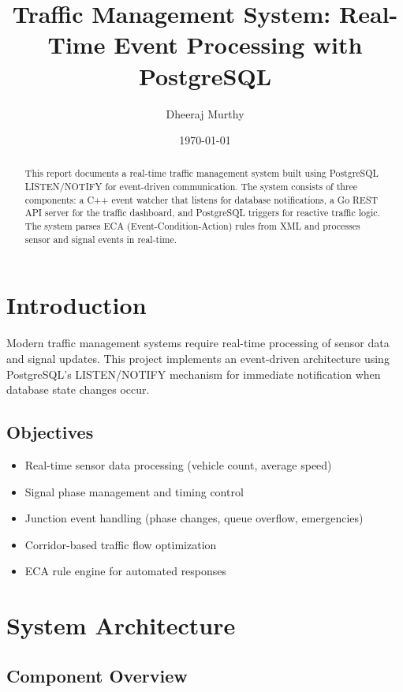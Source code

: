 \documentclass[12pt,a4paper]{article}
\title{Traffic Management System: Real-Time Event Processing with PostgreSQL}
\author{Dheeraj Murthy}
\date{\today}
\begin{document}
\maketitle

\begin{abstract}
This report documents a real-time traffic management system built using PostgreSQL LISTEN/NOTIFY for event-driven communication. The system consists of three components: a C++ event watcher that listens for database notifications, a Go REST API server for the traffic dashboard, and PostgreSQL triggers for reactive traffic logic. The system parses ECA (Event-Condition-Action) rules from XML and processes sensor and signal events in real-time.
\end{abstract}

\tableofcontents
\newpage

\section{Introduction}

Modern traffic management systems require real-time processing of sensor data and signal updates. This project implements an event-driven architecture using PostgreSQL's LISTEN/NOTIFY mechanism for immediate notification when database state changes occur.

\subsection{Objectives}
\begin{itemize}
    \item Real-time sensor data processing (vehicle count, average speed)
    \item Signal phase management and timing control
    \item Junction event handling (phase changes, queue overflow, emergencies)
    \item Corridor-based traffic flow optimization
    \item ECA rule engine for automated responses
\end{itemize}

\section{System Architecture}

\subsection{Component Overview}
\end{document}
